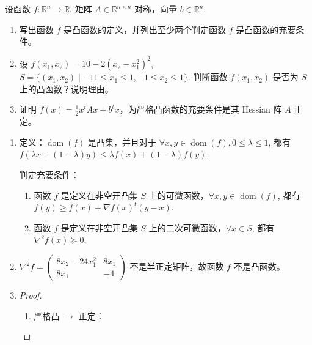 

\newcommand\Title{最优化习题}

\newcommand\subject{\operatorname{s.t.}}
\newcommand\dom{\operatorname{dom}} %

\renewcommand{\labelenumi}{(\arabic*)}


\begin{Problem}
    设函数 $f:\mathbb{R}^n\to \mathbb{R}$. 矩阵 $A \in \mathbb{R}^{n\times n}$ 对称，向量 $b \in \mathbb{R}^n$.
    \begin{enumerate}[label={(\arabic*)}]
        \item 写出函数 $f$ 是凸函数的定义，并列出至少两个判定函数 $f$ 是凸函数的充要条件。
        \item 设 $f(x_1, x_2) = 10 - 2(x_2 - x_1^2)^2$, $S = \{(x_1, x_2) \mid -11 \le x_1 \le 1, -1 \le x_2 \le 1\}$. 判断函数 $f(x_1, x_2)$ 是否为 $S$ 上的凸函数？说明理由。
        \item 证明 $f(x) = \frac{1}{2}x^tAx + b^tx$，为严格凸函数的充要条件是其 Hessian 阵 $A$ 正定。
    \end{enumerate}

    \Answer
    \leavevmode
    \begin{enumerate} 
        \item 定义：$\dom(f)$ 是凸集，并且对于 $\forall x, y \in \dom(f), 0 \le \lambda \le 1$, 都有 $f(\lambda x + (1 - \lambda)y) \le \lambda f(x) + (1 - \lambda)f(y)$.
        
        判定充要条件：
        \begin{enumerate}
            \item 函数 $f$ 是定义在非空开凸集 $S$ 上的可微函数，$\forall x, y \in \dom(f)$, 都有 $f(y) \ge f(x) + \nabla f(x)^t(y - x)$.
            \item 函数 $f$ 是定义在非空开凸集 $S$ 上的二次可微函数，$\forall x \in S$, 都有 $\nabla^2f(x) \succeq 0$.
        \end{enumerate}
        \item $\nabla^2f = \begin{pmatrix}
            8x_2 - 24x_1^2 & 8x_1 \\
            8x_1 & -4
        \end{pmatrix}$ 不是半正定矩阵，故函数 $f$ 不是凸函数。
        \item \begin{proof}\text{}
            \begin{enumerate}
                \item 严格凸 $\to$ 正定：
                

\end{enumerate}
\end{proof}
\end{enumerate}
\end{Problem}
